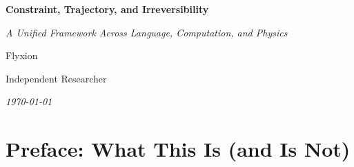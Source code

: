 \documentclass[12pt, twoside]{article}
\theoremstyle{plain}
\theoremstyle{definition}
\theoremstyle{remark}
\begin{document}
\begin{titlepage}
\centering
\vspace*{4cm}
{\fontsize{22}{28}\selectfont\bfseries
  Constraint, Trajectory, and Irreversibility\par}
\vspace{1.2em}
{\large\itshape A Unified Framework Across Language, Computation, and Physics\par}
\vspace{3em}
{\large Flyxion\par}
\vspace{1em}
{\small Independent Researcher\par}
\vfill
{\small\itshape \today\par}
\end{titlepage}

\newpage

\begin{abstract}
\noindent
This essay presents a unified theoretical framework whose four invariants —
constraint primacy, irreversibility, trajectory-dependence, and projection loss —
recur identically across language, computation, artificial intelligence,
and physical cosmology.
The diversity of domains in which this framework appears is not divergence
but projection: each domain instantiates the same underlying structure
through a different representational lens, and each loses a predictable
class of properties in doing so.
After establishing the invariants formally and deriving their consequences,
the essay surveys how they manifest as generative principles across four
domain families, with particular attention to the failure modes produced
when they are violated — Goodhart drift, identity collapse, instability
under compression, and adversarial behavior — and concludes with a
methodology for reading systems that are themselves trajectory-based
and therefore resist summary.
\end{abstract}

\tableofcontents
\newpage

\section*{Preface: What This Is (and Is Not)}
\end{document}
